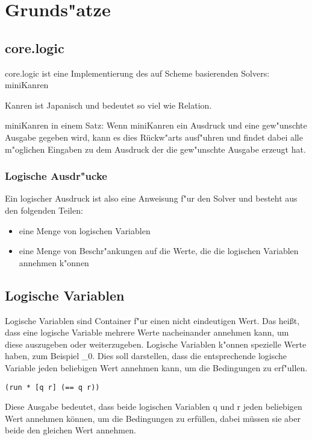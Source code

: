 \section{Grunds"atze}

\subsection{core.logic}

core.logic ist eine Implementierung des auf Scheme basierenden Solvers: miniKanren

Kanren ist Japanisch und bedeutet so viel wie Relation.

miniKanren in einem Satz: Wenn miniKanren ein Ausdruck und eine gew"unschte Ausgabe gegeben wird, kann es dies \dq{}Rückw"arts\dq{} ausf"uhren und findet dabei alle m"oglichen Eingaben zu dem Ausdruck der die gew"unschte Ausgabe erzeugt hat.

\subsubsection{Logische Ausdr"ucke}

Ein logischer Ausdruck ist also eine Anweisung f"ur den Solver und besteht aus den folgenden Teilen:
\begin{itemize}

\item eine Menge von logischen Variablen

\item eine Menge von Beschr"ankungen auf die Werte, die die logischen Variablen annehmen k"onnen

\end{itemize}


\subsection{Logische Variablen}
Logische Variablen sind Container f"ur einen nicht eindeutigen Wert. Das hei\ss{}t, dass eine logische Variable mehrere Werte nacheinander annehmen kann, um diese auszugeben oder weiterzugeben.
Logische Variablen k"onnen spezielle Werte haben, zum Beispiel \_0. Dies soll darstellen, dass die entsprechende logische Variable jeden beliebigen Wert annehmen kann, um die Bedingungen zu erf"ullen.

\begin{lstlisting}
(run * [q r] (== q r))
\end{lstlisting}
\begin{flushleft}
\end{flushleft}
Diese Ausgabe bedeutet, dass beide logischen Variablen q und r jeden beliebigen Wert annehmen können, um die Bedingungen zu erfüllen, dabei müssen sie aber beide den gleichen Wert annehmen.

